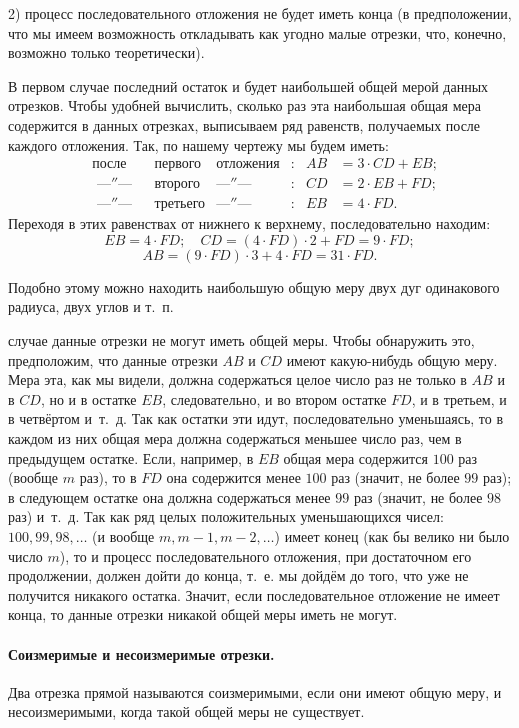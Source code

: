 \documentclass[oneside]{book}
\begin{document}
2) процесс последовательного отложения не будет иметь конца (в предположении, что мы имеем возможность откладывать как угодно малые отрезки, что, конечно, возможно только теоретически).

В первом случае последний остаток и будет наибольшей общей мерой данных отрезков.
Чтобы удобней вычислить, сколько раз эта наибольшая общая мера содержится в данных отрезках, выписываем ряд равенств, получаемых после каждого отложения.
Так, по нашему чертежу мы будем иметь:
\begin{align*}
&\text{после}
&&\text{первого}
&\text{отложения}&:
&AB &= 3\cdot CD + EB;
\\
&\text{\ ---″---}
&&\text{второго}
&\text{---″---\ \ \ \ }&:
&CD &= 2\cdot EB + FD;
\\
&\text{\ ---″---}
&&\text{третьего}
&\text{---″---\ \ \ \ }&:
&EB &= 4\cdot FD.
\end{align*}
Переходя в этих равенствах от нижнего к верхнему, последовательно находим:
\[
EB=4\cdot FD;
\quad
CD=(4\cdot FD)\cdot 2+FD=9\cdot FD;
\]
\[
AB=(9\cdot FD)\cdot 3+4\cdot FD=31\cdot FD.
\]

Подобно этому можно находить наибольшую общую меру двух дуг одинакового радиуса, двух углов и т.~п.

 случае данные отрезки не могут иметь общей меры.
Чтобы обнаружить это, предположим, что данные отрезки $AB$ и $CD$ имеют какую-нибудь общую меру.
Мера эта, как мы видели, должна содержаться целое число раз не только в $AB$ и в $CD$, но и в остатке $EB$, следовательно, и во втором остатке $FD$, и в третьем, и в четвёртом и~т.~д.
Так как остатки эти идут, последовательно уменьшаясь, то в каждом из них общая мера должна содержаться меньшее число раз, чем в предыдущем остатке.
Если, например, в $EB$ общая мера содержится $100$ раз (вообще $m$ раз), то в $FD$ она содержится менее $100$ раз (значит, не более $99$ раз);
в следующем остатке она должна содержаться менее $99$ раз (значит, не более $98$ раз) и~т.~д.
Так как ряд целых положительных уменьшающихся чисел:
$100, 99, 98, \dots$
(и вообще $m, m-1, m-2,\dots$) имеет конец (как бы велико ни было число $m$), то и процесс последовательного отложения, при достаточном его продолжении, должен дойти до конца, т.~е. мы дойдём до того, что уже не получится никакого остатка.
Значит, если последовательное отложение не имеет конца, то данные отрезки никакой общей меры иметь не могут.

\paragraph{Соизмеримые и несоизмеримые отрезки.}\label{1938/148}
Два отрезка прямой называются соизмеримыми, если они имеют общую меру, и несоизмеримыми, когда такой общей меры не существует.
\end{document}
